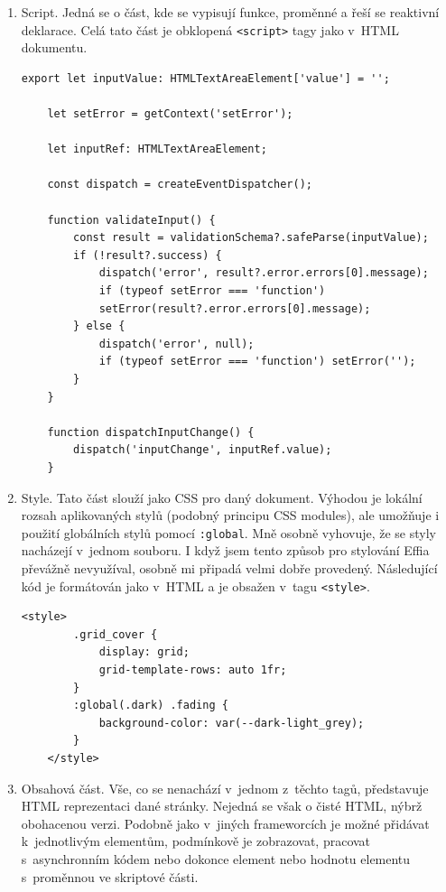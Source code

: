 \documentclass[12pt, a4paper,
openright
]{report}
\begin{document}
\begin{enumerate}
	\item Script. Jedná se o část, kde se vypisují funkce, proměnné a řeší se reaktivní deklarace. Celá tato část je obklopená \texttt{<script>} tagy jako v~HTML dokumentu.
	\begin{lstlisting}[style=ES6, caption=Ukázka Svelte kódu ve script tagu, label=svelte-script-sample]
	export let inputValue: HTMLTextAreaElement['value'] = '';
	
	let setError = getContext('setError');
	
	let inputRef: HTMLTextAreaElement;
	
	const dispatch = createEventDispatcher();
	
	function validateInput() {
		const result = validationSchema?.safeParse(inputValue);
		if (!result?.success) {
			dispatch('error', result?.error.errors[0].message);
			if (typeof setError === 'function')
			setError(result?.error.errors[0].message);
		} else {
			dispatch('error', null);
			if (typeof setError === 'function') setError('');
		}
	}
	
	function dispatchInputChange() {
		dispatch('inputChange', inputRef.value);
	}\end{lstlisting}
	\item Style. Tato část slouží jako CSS pro daný dokument. Výhodou je lokální rozsah aplikovaných stylů (podobný principu CSS modules), ale umožňuje i použití globálních stylů pomocí \texttt{:global}. Mně osobně vyhovuje, že se styly nacházejí v~jednom souboru. I když jsem tento způsob pro stylování Effia převážně nevyužíval, osobně mi připadá velmi dobře provedený. Následující kód je formátován jako v~HTML a je obsažen v~tagu \texttt{<style>}.
	
	\begin{lstlisting}[style=ES6, caption=Ukázka Svelte CSS kódu, label=svelte-CSS-sample]
	<style>
		.grid_cover {
			display: grid;
			grid-template-rows: auto 1fr;
		}
		:global(.dark) .fading {
			background-color: var(--dark-light_grey);
		}
	</style>\end{lstlisting}
	\item Obsahová část. Vše, co se nenachází v~jednom z~těchto tagů, představuje HTML reprezentaci dané stránky. Nejedná se však o čisté HTML, nýbrž obohacenou verzi. Podobně jako v~jiných frameworcích je možné přidávat  k~jednotlivým elementům, podmínkově je zobrazovat, pracovat s~asynchronním kódem nebo dokonce  element nebo hodnotu elementu s~proměnnou ve skriptové části.
	

\end{enumerate}
\end{document}
